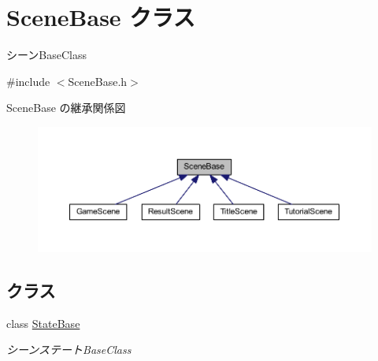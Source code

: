 \hypertarget{class_scene_base}{}\section{Scene\+Base クラス}
\label{class_scene_base}


シーン\+Base\+Class  




{\ttfamily \#include $<$Scene\+Base.\+h$>$}



Scene\+Base の継承関係図\nopagebreak
\begin{figure}[H]
\begin{center}
\leavevmode
\includegraphics[width=350pt]{class_scene_base__inherit__graph}
\end{center}
\end{figure}
\subsection*{クラス}
\begin{DoxyCompactItemize}
\item 
class \mbox{\hyperlink{class_scene_base_1_1_state_base}{State\+Base}}
\begin{DoxyCompactList}\small\item\em シーンステート\+Base\+Class \end{DoxyCompactList}\end{DoxyCompactItemize}
